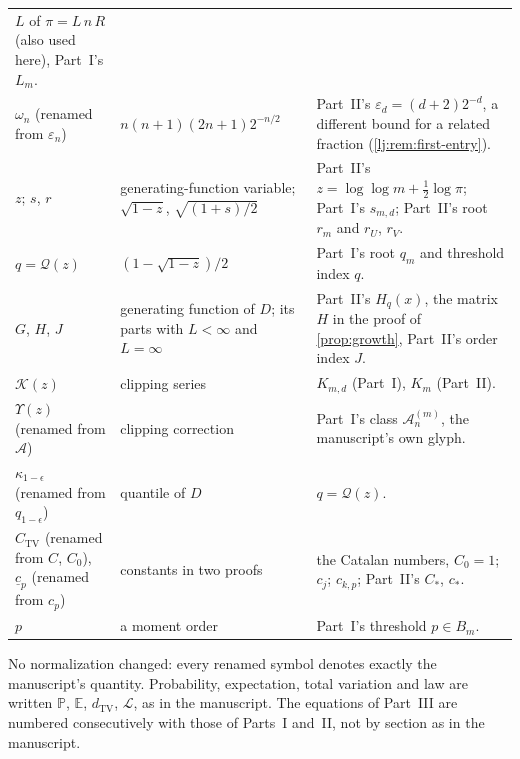 \documentclass[11pt,a4paper]{article}
\theoremstyle{definition}\newaliascnt{definition}{theorem}
\theoremstyle{remark}\newaliascnt{remark}{theorem}
\newcommand{\Aclass}{\mathcal A}
\newcommand{\eps}{\varepsilon}
\newcommand{\ljP}{\mathbb P}
\newcommand{\ljE}{\mathbb E}
\newcommand{\ljTV}{d_{\mathrm{TV}}}
\newcommand{\ljLaw}{\mathcal L}
\newcommand{\ljQ}{\mathcal Q}
\newcommand{\ljK}{\mathcal K}
\newcommand{\ljU}{\Upsilon}
\begin{document}
\begin{table}[htbp]
\begin{tabular}{>{\raggedright}p{.19\linewidth}>{\raggedright}p{.36\linewidth}>{\raggedright\arraybackslash}p{.37\linewidth}}
 $L$ of $\pi=L\,n\,R$ (also used here), Part~I's $L_m$.\\
$\omega_n$ (renamed from $\eps_n$) & $n(n+1)(2n+1)2^{-n/2}$ & Part~II's
 $\eps_d=(d+2)2^{-d}$, a different bound for a related fraction
 (\cref{lj:rem:first-entry}).\\
$z$; $s$, $r$ & generating-function variable; $\sqrt{1-z}$,
 $\sqrt{(1+s)/2}$ & Part~II's $z=\log\log m+\frac12\log\pi$; Part~I's
 $s_{m,d}$; Part~II's root $r_m$ and $r_U$, $r_V$.\\
$q=\ljQ(z)$ & $(1-\sqrt{1-z})/2$ & Part~I's root $q_m$ and threshold
 index $q$.\\
$G$, $H$, $J$ & generating function of $D$; its parts with $L<\infty$ and
 $L=\infty$ & Part~II's $H_q(x)$, the matrix $H$ in the proof of
 \cref{prop:growth}, Part~II's order index $J$.\\
$\ljK(z)$ & clipping series & $K_{m,d}$ (Part~I), $K_m$ (Part~II).\\
$\ljU(z)$ (renamed from $\mathcal A$) & clipping correction &
 Part~I's class $\Aclass_n^{(m)}$, the manuscript's own glyph.\\
$\kappa_{1-\epsilon}$ (renamed from $q_{1-\epsilon}$) & quantile of $D$ &
 $q=\ljQ(z)$.\\
$C_{\mathrm{TV}}$ (renamed from $C$, $C_0$), $\underline c_p$ (renamed from
 $c_p$) & constants in two proofs & the Catalan numbers, $C_0=1$; $c_j$;
 $c_{k,p}$; Part~II's $C_\ast$, $c_\ast$.\\
$p$ & a moment order & Part~I's threshold $p\in B_m$.\\
\bottomrule
\end{tabular}
\end{table}

No normalization changed: every renamed symbol denotes exactly the
manuscript's quantity. Probability, expectation, total variation and law are
written $\ljP$, $\ljE$, $\ljTV$, $\ljLaw$, as in the manuscript. The
equations of Part~III are numbered consecutively with those of Parts~I
and~II, not by section as in the manuscript.
\end{document}
